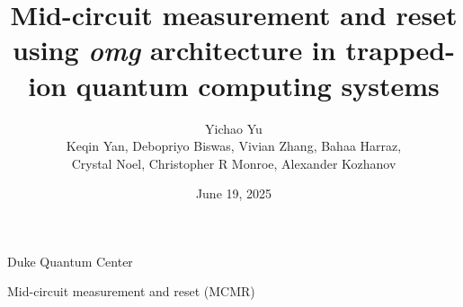 \documentclass{beamer}
\title[MCMR with \textit{omg}]{Mid-circuit measurement and reset using \textit{omg} architecture in trapped-ion quantum computing systems}
\date{June 19, 2025}
\author[Yichao Yu]{Yichao Yu\\
  \vspace{0.5cm}
  {\footnotesize Keqin Yan, Debopriyo Biswas, Vivian Zhang, Bahaa Harraz,}\\
  {\footnotesize Crystal Noel, Christopher R Monroe, Alexander Kozhanov}}
\institute[Duke Quantum Center]{Monroe Group/Duke Quantum Center}
\begin{document}


{
  \begin{frame}{}
    \titlepage
  \end{frame}
}


\begin{frame}{Duke Quantum Center}
\end{frame}



\begin{frame}{Mid-circuit measurement and reset (MCMR)}
  \begin{tikzpicture}
  \end{tikzpicture}
\end{frame}
\end{document}
